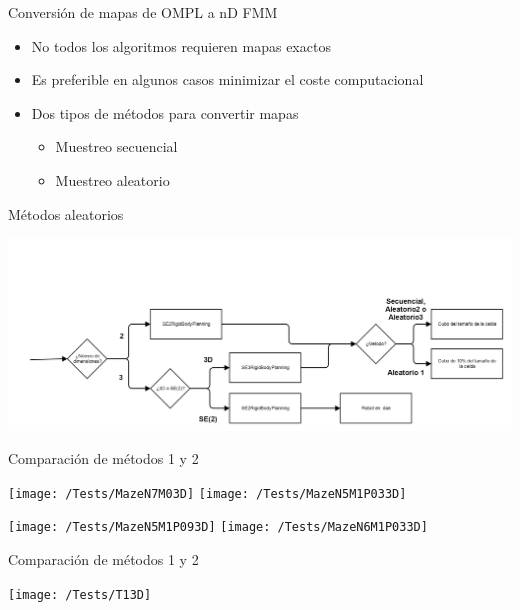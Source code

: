 \documentclass[10pt]{beamer}
\begin{document}
\begin{frame}{Conversión de mapas de OMPL a nD FMM}
	\begin{itemize}
		\item No todos los algoritmos requieren mapas exactos
		\item Es preferible en algunos casos minimizar el coste computacional
		
		\vspace{0.5cm}
		\item Dos tipos de métodos para convertir mapas
			\begin{itemize}
				\item Muestreo secuencial
				\item Muestreo aleatorio
			\end{itemize}
		
	\end{itemize}
\end{frame}

\begin{frame}{Métodos aleatorios}
\begin{center}
\includegraphics[width=\textwidth,height=0.8\textheight,keepaspectratio]{seleccion}	
\end{center}
\end{frame}

\begin{frame}{Comparación de métodos 1 y 2}
\begin{center}
\texttt{[image: /Tests/MazeN7M03D]}
\texttt{[image: /Tests/MazeN5M1P033D]}

\texttt{[image: /Tests/MazeN5M1P093D]}
\texttt{[image: /Tests/MazeN6M1P033D]}
\end{center}
\end{frame}

\begin{frame}{Comparación de métodos 1 y 2}
\vfill
\begin{center}
\texttt{[image: /Tests/T13D]}
\end{center}
\end{frame}
\end{document}
